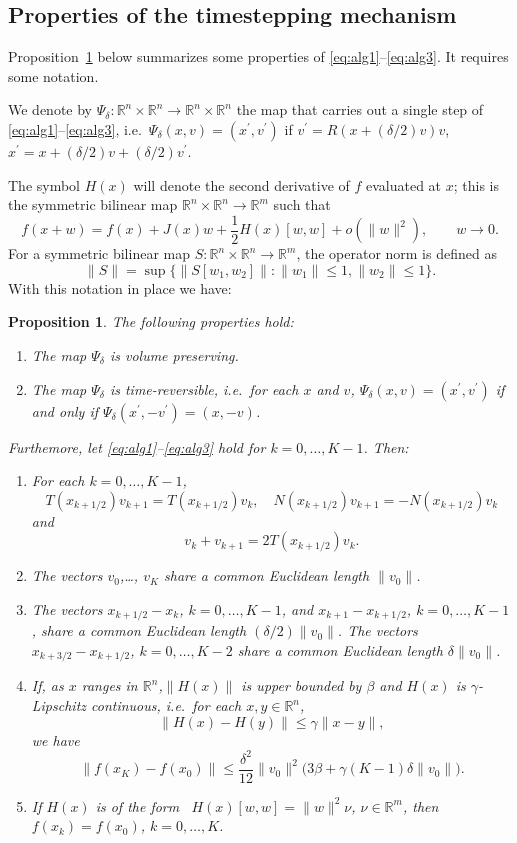 \documentclass[10pt]{article}
\newcommand{\bbR}{\mathbb R}
\newtheorem{proposition}{Proposition}
\begin{document}
\subsection{Properties of the timestepping mechanism}
\label{subsec:properties}

Proposition~\ref{prop:alg} below summarizes some properties of \eqref{eq:alg1}--\eqref{eq:alg3}. It requires some notation.

We denote by \(\Psi_\delta:\bbR^n\times \bbR^n\rightarrow \bbR^n\times \bbR^n\) the map that carries out a single step of \eqref{eq:alg1}--\eqref{eq:alg3}, i.e.\ \(\Psi_\delta(x,v)= (x^\prime,v^\prime)\) if \(v^\prime = R(x+(\delta/2)v)v\), \(x^\prime = x+(\delta/2)v+(\delta/2)v^\prime\).

The symbol \(H(x)\) will denote the second derivative of \(f\) evaluated at \(x\); this is the symmetric bilinear map \(\bbR^n\times\bbR^n\rightarrow \bbR^m\) such that
\[
f(x+w)= f(x) + J(x)w+\frac{1}{2} H(x)[w,w]+ o(\|w\|^2), \qquad w\rightarrow 0.
\]
For a symmetric bilinear map \(S:\bbR^n\times\bbR^n\rightarrow \bbR^m\),  the operator norm  is defined as
\[
\|S\| = \sup \{\|S[w_1,w_2]\|: \|w_1\|\leq 1,  \|w_2\|\leq 1\}.
\]
With this notation in place we have:
\begin{proposition}\label{prop:alg}
The following properties hold:
\begin{enumerate}
\item The map \(\Psi_\delta\) is volume preserving.
\item The map \(\Psi_\delta\) is time-reversible, i.e.\ for each \(x\) and \(v\), \(\Psi_\delta(x,v) = (x^\prime,v^\prime)\) if and only if
\(\Psi_\delta(x^\prime,-v^\prime) = (x,-v)\).
\end{enumerate}
Furthemore, let \eqref{eq:alg1}--\eqref{eq:alg3} hold for \(k=0,\dots, K-1\). Then:
\begin{enumerate}
\item[3.]
For each \(k= 0,\dots,K-1\), \[T(x_{k+1/2})v_{k+1}= T(x_{k+1/2})v_{k},\quad N(x_{k+1/2})v_{k+1}= -N(x_{k+1/2})v_{k}\]
and \[ v_k+v_{k+1} = 2T(x_{k+1/2}) v_k.\]
\item[4.] The vectors \(v_0\),\dots, \(v_K\) share a common Euclidean length \(\|v_0\|\).
\item[5.] The vectors \(x_{k+1/2}-x_k\), \(k=0,\dots, K-1\), and  \(x_{k+1}-x_{k+1/2}\), \(k=0, \dots,K-1\), share a common Euclidean length
\((\delta/2)\|v_0\|\). The vectors \(x_{k+3/2}-x_{k+1/2}\), \(k = 0, \dots, K-2\) share a common Euclidean length \(\delta\|v_0\|\).
\item[6.]   If, as \(x\) ranges in \(\bbR^n\),\(\|H(x)\|\) is upper bounded by \(\beta\) and \(H(x)\) is \(\gamma\)-Lipschitz continuous, i.e.\ for each \(x,y\in\bbR^n\),
\[
\|H(x)-H(y)\| \leq \gamma \|x-y\|,
\]
we have
\[
\big\|f(x_K)-f(x_0)\big\| \leq \frac{\delta^2}{12} \|v_0\|^2 \big(3\beta+ \gamma (K-1)\delta \|v_0\|\big).
\]
\item[7.] If \(H(x)\) is of the form \ \(H(x)[w,w] =  \|w\|^2\nu\), \(\nu\in\bbR^m\), then \(f(x_k)=f(x_0)\), \(k= 0, \dots,K\).
\end{enumerate}
\end{proposition}
%
\end{document}
